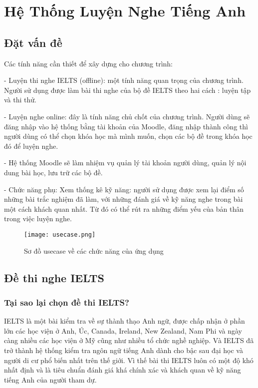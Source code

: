 \chapter{Hệ Thống Luyện Nghe Tiếng Anh }

\ifpdf
    \graphicspath{{Chapter3/Chapter3Figs/PNG/}{Chapter3/Chapter3Figs/PDF/}{Chapter3/Chapter3Figs/}}
\else
    \graphicspath{{Chapter3/Chapter3Figs/EPS/}{Chapter3/Chapter3Figs/}}
\fi

\section{Đặt vấn đề}

Các tính năng cần thiết để xây dựng cho chương trình:

\quad - Luyện thi nghe IELTS (offline): một tính năng quan trọng của chương trình. Người sử dụng được làm bài thi nghe của bộ đề IELTS theo hai cách : luyện tập và thi thử.

\quad -	Luyện nghe online: đây là tính năng chủ chốt của chương trình. Người dùng sẽ đăng nhập vào hệ thống bằng tài khoản của Moodle, đăng nhập thành công thì người dùng có thể chọn khóa học mà mình muốn, chọn các bộ đề trong khóa học đó để luyện nghe.

\quad - Hệ thống Moodle sẽ làm nhiệm vụ quản lý tài khoản người dùng, quản lý nội dung bài học, lưu trữ các bộ đề. 

\quad -	Chức năng phụ: Xem thống kê kỹ năng: người sử dụng được xem lại điểm số những bài trắc nghiệm đã làm, với những đánh giá về kỹ năng nghe trong bài một cách khách quan nhất. Từ đó có thể rút ra những điểm yếu của bản thân trong việc luyện nghe.

\begin{figure}[!htb] 
\centering
\texttt{[image: usecase.png]}
\caption{Sơ đồ usecase về các chức năng của ứng dụng}
\end{figure}

\section{Đề thi nghe IELTS}
\subsection{Tại sao lại chọn đề thi IELTS?}

IELTS là một bài kiểm tra về sự thành thạo Anh ngữ, được chấp nhận ở phần lớn các học viện ở Anh, Úc, Canada, Ireland, New Zealand, Nam Phi và ngày càng nhiều các học viện ở Mỹ cũng như nhiều tổ chức nghề nghiệp. Và IELTS đã trở thành hệ thống kiểm tra ngôn ngữ tiếng Anh dành cho bậc sau đại học và người di cư phổ biến nhất trên thế giới. Vì thế bài thi IELTS luôn có một độ khó nhất định và là tiêu chuẩn đánh giá khá chính xác và khách quan về kỹ năng tiếng Anh của người tham dự.

